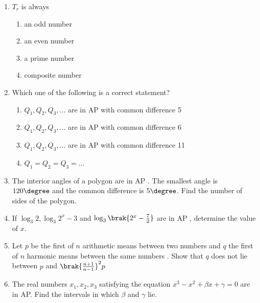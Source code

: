 \begin{enumerate}    [label=\thesubsection.\arabic*, ref=\thesubsection.\theenumi]
\begin{multicols}{2}
\begin{enumerate}
	     \item $\frac{1}{2}n\brak{2n^{2}-n+1}$
	     \item $\frac{1}{3}\brak{2n^{3}-2n+3}$
    \end{enumerate}
\end{multicols} 
%
  \item $T_{r}$ is always 
%                           
	  \hfill {}                    
                  \begin{multicols}{2}      
\begin{enumerate}     
%	
       \item an odd number 
       \item an even number
	\item a prime number 
        \item composite number
%
	  \end{enumerate}
   \end{multicols}
    \item Which one of the following is a correct statement? 
%          
	    \hfill {}                                  
\begin{enumerate}    
	\item $Q_{1}, Q_{2}, Q_{3}, \dots$ are in AP with common difference 5 
	\item $Q_{1}, Q_{2}, Q_{3}, \dots$ are in AP with common difference 6
	\item $Q_{1}, Q_{2}, Q_{3}, \dots$ are in AP with common difference 11
	\item $Q_{1}=Q_{2}=Q_{3}=\dots$
	\end{enumerate}
%       
%
\item The interior angles of a polygon are in  AP . The smallest angle is $120\degree$ and the common difference is $5\degree$. Find the number of sides of the polygon.
%
\hfill{}
%
%
%	    
	     \item If $ \log_{3}{2}, \log_{3}{2^{x}-3} $ and $ \log_{3}{\brak{2^{x}-\frac{7}{2}}} $ are in  AP , determine the value of $x$.  
%     
	      \hfill {}
%      
%
      \item Let $p$ be the first of $n$ arithmetic means between two numbers and $q$ the first of $n$ harmonic means between the same numbers . Show that $q$ does not lie between $p$ and $\brak{\frac{n+1}{n-1}}^{2}p$ 
%       
	      \hfill {}
%      
%
%       
%
		\item  The real numbers $ x_{1}, x_{2}, x_{3} $ satisfying the equation $ x^{3}-x^{2}+\beta x+\gamma=0 $ are in AP. Find the intervals in which $ \beta $ and $\gamma$ lie.

\end{enumerate}
